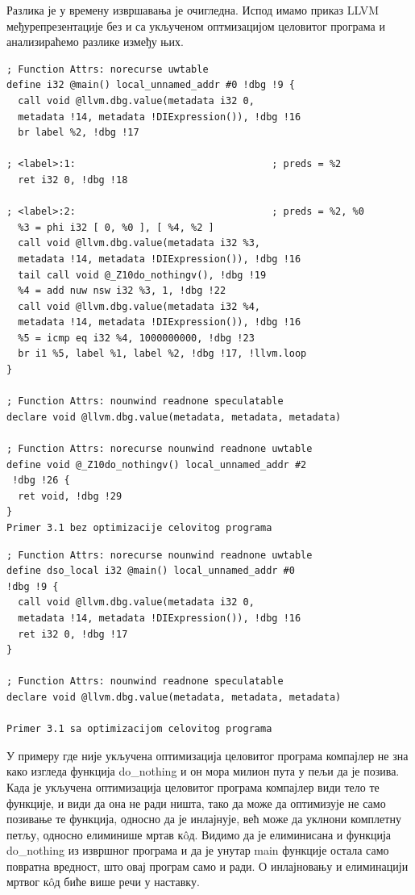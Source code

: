 \documentclass[12pt,oneside]{memoir}
\begin{document}
Разлика је у времену извршавања је очигледна.
Испод имамо приказ LLVM међурепрезентације без и са укљученом оптмизацијом целовитог програма
и анализираћемо разлике између њих.
\begin{lstlisting}
; Function Attrs: norecurse uwtable
define i32 @main() local_unnamed_addr #0 !dbg !9 {
  call void @llvm.dbg.value(metadata i32 0, 
  metadata !14, metadata !DIExpression()), !dbg !16
  br label %2, !dbg !17

; <label>:1:                                  ; preds = %2
  ret i32 0, !dbg !18

; <label>:2:                                  ; preds = %2, %0
  %3 = phi i32 [ 0, %0 ], [ %4, %2 ]
  call void @llvm.dbg.value(metadata i32 %3, 
  metadata !14, metadata !DIExpression()), !dbg !16
  tail call void @_Z10do_nothingv(), !dbg !19
  %4 = add nuw nsw i32 %3, 1, !dbg !22
  call void @llvm.dbg.value(metadata i32 %4,
  metadata !14, metadata !DIExpression()), !dbg !16
  %5 = icmp eq i32 %4, 1000000000, !dbg !23
  br i1 %5, label %1, label %2, !dbg !17, !llvm.loop
}

; Function Attrs: nounwind readnone speculatable
declare void @llvm.dbg.value(metadata, metadata, metadata)

; Function Attrs: norecurse nounwind readnone uwtable
define void @_Z10do_nothingv() local_unnamed_addr #2 
 !dbg !26 {
  ret void, !dbg !29
}
Primer 3.1 bez optimizacije celovitog programa
\end{lstlisting}


\begin{lstlisting}
; Function Attrs: norecurse nounwind readnone uwtable
define dso_local i32 @main() local_unnamed_addr #0 
!dbg !9 {
  call void @llvm.dbg.value(metadata i32 0, 
  metadata !14, metadata !DIExpression()), !dbg !16
  ret i32 0, !dbg !17
}

; Function Attrs: nounwind readnone speculatable
declare void @llvm.dbg.value(metadata, metadata, metadata)

Primer 3.1 sa optimizacijom celovitog programa
\end{lstlisting}

У примеру где није укључена оптимизација целовитог програма компајлер не зна како
изгледа функција do{\_}nothing и он мора милион пута у пељи да је позива.
Када је укључена оптимизација целовитог програма компајлер види тело те функције,
и види да она не ради ништа, тако да може да оптимизује не само позивање те функција,
односно да је инлајнује, већ може да уклнони комплетну петљу, односно елиминише мртав 
к\^{o}д.
Видимо да је елиминисана и функција do{\_}nothing из извршног програма и да је унутар
main функције остала само повратна вредност, што овај програм само и ради.
О инлајновању и елиминацији мртвог к\^{o}д биће више речи у наставку.
\end{document}
